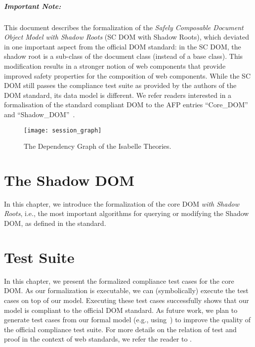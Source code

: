 \documentclass[10pt,DIV16,a4paper,abstract=true,twoside=semi,openright]
{scrreprt}
\begin{document}
\paragraph{Important Note:} This document describes the formalization
of the \emph{Safely Composable Document Object Model with Shadow
  Roots} (SC DOM with Shadow Roots), which deviated in one important
aspect from the official DOM standard: in the SC DOM, the shadow root
is a sub-class of the document class (instead of a base class). This
modification results in a stronger notion of web components that
provide improved safety properties for the composition of web
components. While the SC DOM still passes the compliance test suite as
provided by the authors of the DOM standard, its data model is
different. We refer readers interested in a formalisation of the
standard compliant DOM to the AFP entries
``Core\_DOM''~\cite{brucker.ea:afp-core-dom:2018} and
``Shadow\_DOM''~\cite{brucker.ea:afp-shadow-dom:2020}.


\begin{figure}
  \centering
  \texttt{[image: session\_graph]}
  \caption{The Dependency Graph of the Isabelle Theories.\label{fig:session-graph}}
\end{figure}

\clearpage

\chapter{The Shadow DOM}
\label{cha:dom}
In this chapter, we introduce the formalization of the core DOM
\emph{with Shadow Roots}, i.e., the most important algorithms for
querying or modifying the Shadow DOM, as defined in the standard.






\chapter{Test Suite}
\label{cha:tests}
In this chapter, we present the formalized compliance test cases for
the core DOM. As our formalization is executable, we can
(symbolically) execute the test cases on top of our model. Executing
these test cases successfully shows that our model is compliant to the
official DOM standard. As future work, we plan to generate test cases
from our formal model (e.g.,
using~\cite{brucker.ea:interactive:2005,brucker.ea:theorem-prover:2012})
to improve the quality of the official compliance test suite. For more
details on the relation of test and proof in the context of web
standards, we refer the reader to
\cite{brucker.ea:standard-compliance-testing:2018}.











{\small
  
  
}
\end{document}
